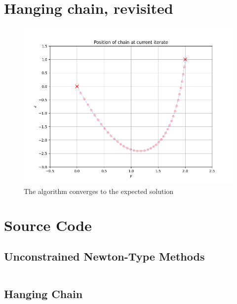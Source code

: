 \documentclass[oneside, a4paper]{book}
\begin{document}
\chapter{Hanging chain, revisited}
\begin{figure}[H]
  \centering 
  \includegraphics[width=\textwidth]{screenshot.png}
  \caption{The algorithm converges to the expected solution}
  \label{fig:hanging-chain}
\end{figure}

\chapter{Source Code}

\section{Unconstrained Newton-Type Methods}
\inputminted{python}{unconstrained_newton.py}
\section{Hanging Chain}
\inputminted{python}{hanging_chain_next_episode.py}
\end{document}
